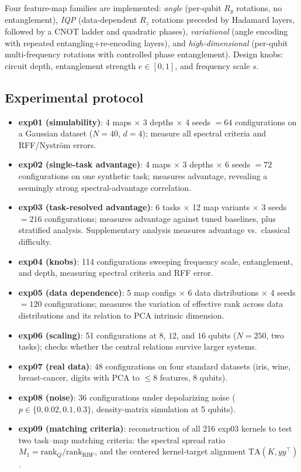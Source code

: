 \documentclass[a4paper,unpublished,onecolumn,nopdfoutputerror,12pt]{quantumarticle}
\begin{document}
Four feature-map families are implemented:
\emph{angle} (per-qubit $R_y$ rotations, no entanglement), \emph{IQP} (data-dependent
$R_z$ rotations preceded by Hadamard layers, followed by a CNOT ladder and quadratic
phases), \emph{variational} (angle encoding with repeated entangling+re-encoding layers),
and \emph{high-dimensional} (per-qubit multi-frequency rotations with controlled phase
entanglement). Design knobs: circuit depth, entanglement strength $e\in[0,1]$, and
frequency scale $s$.

\subsection{Experimental protocol}
\label{sec:methods-protocol}

\begin{itemize}
\item \textbf{exp01 (simulability)}: 4 maps $\times$ 3 depths $\times$ 4 seeds $=64$
configurations on a Gaussian dataset ($N=40$, $d=4$); measure all spectral criteria and
RFF/Nystr\"om errors.
\item \textbf{exp02 (single-task advantage)}: 4 maps $\times$ 3 depths $\times$ 6 seeds
$=72$ configurations on one synthetic task; measures advantage, revealing a seemingly
strong spectral-advantage correlation.
\item \textbf{exp03 (task-resolved advantage)}: 6 tasks $\times$ 12 map variants
$\times$ 3 seeds $=216$ configurations; measures advantage against tuned baselines,
plus stratified analysis. Supplementary analysis measures advantage vs.\ classical
difficulty.
\item \textbf{exp04 (knobs)}: 114 configurations sweeping frequency scale, entanglement,
and depth, measuring spectral criteria and RFF error.
\item \textbf{exp05 (data dependence)}: 5 map configs $\times$ 6 data distributions
$\times$ 4 seeds $=120$ configurations; measures the variation of effective rank across
data distributions and its relation to PCA intrinsic dimension.
\item \textbf{exp06 (scaling)}: 51 configurations at $8$, $12$, and $16$ qubits
($N=250$, two tasks); checks whether the central relations survive larger systems.
\item \textbf{exp07 (real data)}: 48 configurations on four standard datasets
(iris, wine, breast-cancer, digits with PCA to $\le8$ features, 8 qubits).
\item \textbf{exp08 (noise)}: 36 configurations under depolarizing noise
($p\in\{0,0.02,0.1,0.3\}$, density-matrix simulation at 5 qubits).
\item \textbf{exp09 (matching criteria)}: reconstruction of all 216 exp03 kernels to
test two task--map matching criteria: the spectral spread ratio
$M_1=\mathrm{rank}_Q/\mathrm{rank}_{\mathrm{RBF}}$, and the centered kernel-target
alignment $\mathrm{TA}(K,yy^{\top})$.
\end{itemize}
\end{document}
